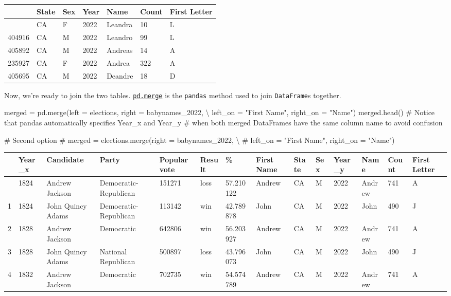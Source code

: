 \documentclass[
  letterpaper,
  DIV=11,
  numbers=noendperiod]{scrreprt}
\newenvironment{Shaded}{\begin{snugshade}}{\end{snugshade}}
\newcommand{\CommentTok}[1]{\textcolor[rgb]{0.37,0.37,0.37}{#1}}
\newcommand{\NormalTok}[1]{\textcolor[rgb]{0.00,0.23,0.31}{#1}}
\newcommand{\OperatorTok}[1]{\textcolor[rgb]{0.37,0.37,0.37}{#1}}
\newcommand{\StringTok}[1]{\textcolor[rgb]{0.13,0.47,0.30}{#1}}
\begin{document}
\begin{longtable}[]{@{}lllllll@{}}
\toprule\noalign{}
& State & Sex & Year & Name & Count & First Letter \\
\midrule\noalign{}
\endhead
\bottomrule\noalign{}
\endlastfoot
237964 & CA & F & 2022 & Leandra & 10 & L \\
404916 & CA & M & 2022 & Leandro & 99 & L \\
405892 & CA & M & 2022 & Andreas & 14 & A \\
235927 & CA & F & 2022 & Andrea & 322 & A \\
405695 & CA & M & 2022 & Deandre & 18 & D \\
\end{longtable}

Now, we're ready to join the two tables.
\href{https://pandas.pydata.org/docs/reference/api/pandas.DataFrame.merge.html}{\texttt{pd.merge}}
is the \texttt{pandas} method used to join \texttt{DataFrame}s together.

\begin{Shaded}
\begin{Highlighting}[]
\NormalTok{merged }\OperatorTok{=}\NormalTok{ pd.merge(left }\OperatorTok{=}\NormalTok{ elections, right }\OperatorTok{=}\NormalTok{ babynames\_2022, }\OperatorTok{\textbackslash{}}
\NormalTok{                  left\_on }\OperatorTok{=} \StringTok{"First Name"}\NormalTok{, right\_on }\OperatorTok{=} \StringTok{"Name"}\NormalTok{)}
\NormalTok{merged.head()}
\CommentTok{\# Notice that pandas automatically specifies \textasciigrave{}Year\_x\textasciigrave{} and \textasciigrave{}Year\_y\textasciigrave{} }
\CommentTok{\# when both merged DataFrames have the same column name to avoid confusion}

\CommentTok{\# Second option}
\CommentTok{\# merged = elections.merge(right = babynames\_2022, \textbackslash{}}
    \CommentTok{\# left\_on = "First Name", right\_on = "Name")}
\end{Highlighting}
\end{Shaded}

\begin{longtable}[]{@{}llllllllllllll@{}}
\toprule\noalign{}
& Year\_x & Candidate & Party & Popular vote & Result & \% & First Name
& State & Sex & Year\_y & Name & Count & First Letter \\
\midrule\noalign{}
\endhead
\bottomrule\noalign{}
\endlastfoot
0 & 1824 & Andrew Jackson & Democratic-Republican & 151271 & loss &
57.210122 & Andrew & CA & M & 2022 & Andrew & 741 & A \\
1 & 1824 & John Quincy Adams & Democratic-Republican & 113142 & win &
42.789878 & John & CA & M & 2022 & John & 490 & J \\
2 & 1828 & Andrew Jackson & Democratic & 642806 & win & 56.203927 &
Andrew & CA & M & 2022 & Andrew & 741 & A \\
3 & 1828 & John Quincy Adams & National Republican & 500897 & loss &
43.796073 & John & CA & M & 2022 & John & 490 & J \\
4 & 1832 & Andrew Jackson & Democratic & 702735 & win & 54.574789 &
Andrew & CA & M & 2022 & Andrew & 741 & A \\
\end{longtable}
\end{document}
